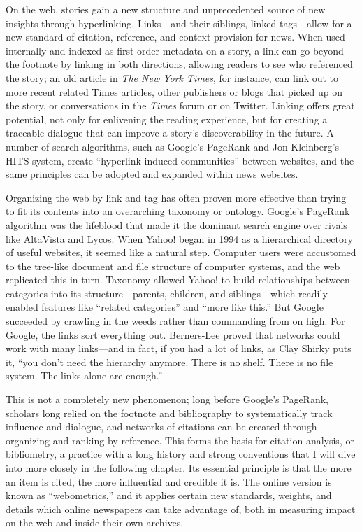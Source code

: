 On the web, stories gain a new structure and unprecedented source of new insights through hyperlinking. Links---and their siblings, linked tags---allow for a new standard of citation, reference, and context provision for news. When used internally and indexed as first-order metadata on a story, a link can go beyond the footnote by linking in both directions, allowing readers to see who referenced the story; an old article in \emph{The New York Times}, for instance, can link out to more recent related Times articles, other publishers or blogs that picked up on the story, or conversations in the \emph{Times} forum or on Twitter. Linking offers great potential, not only for enlivening the reading experience, but for creating a traceable dialogue that can improve a story's discoverability in the future. A number of search algorithms, such as Google's PageRank and Jon Kleinberg's HITS system, create ``hyperlink-induced communities'' between websites, and the same principles can be adopted and expanded within news websites.\autocite[12. See also section 5.1.]{chakrabarti_mining_2003}

Organizing the web by link and tag has often proven more effective than trying to fit its contents into an overarching taxonomy or ontology. Google's PageRank algorithm was the lifeblood that made it the dominant search engine over rivals like AltaVista and Lycos.\autocite{shirky_ontology_2005} When Yahoo! began in 1994 as a hierarchical directory of useful websites, it seemed like a natural step. Computer users were accustomed to the tree-like document and file structure of computer systems, and the web replicated this in turn. Taxonomy allowed Yahoo! to build relationships between categories into its structure---parents, children, and siblings---which readily enabled features like ``related categories'' and ``more like this.'' But Google succeeded by crawling in the weeds rather than commanding from on high. For Google, the links sort everything out. Berners-Lee proved that networks could work with many links---and in fact, if you had a lot of links, as Clay Shirky puts it, ``you don't need the hierarchy anymore. There is no shelf. There is no file system. The links alone are enough.''\autocite{shirky_ontology_2005}

This is not a completely new phenomenon; long before Google's PageRank, scholars long relied on the footnote and bibliography to systematically track influence and dialogue, and networks of citations can be created through organizing and ranking by reference. This forms the basis for citation analysis, or bibliometry, a practice with a long history and strong conventions that I will dive into more closely in the following chapter. Its essential principle is that the more an item is cited, the more influential and credible it is. The online version is known as ``webometrics,'' and it applies certain new standards, weights, and details which online newspapers can take advantage of, both in measuring impact on the web and inside their own archives.

